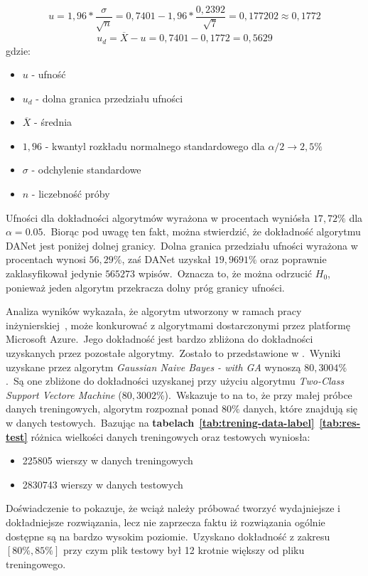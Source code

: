 \begin{itemize}
    \begin{equation}
        \label{eq:uf}
        u = 1,96 * \frac{\sigma}{\sqrt{n}}= 0,7401-1,96*\frac{0,2392}{\sqrt{7}} = 0,177202 \approx 0,1772
    \end{equation}
    \begin{equation}
        \label{eq:uf-d}
        u_d = \overline{X} - u = 0,7401 - 0,1772 = 0,5629
    \end{equation}
    gdzie:
    \begin{itemize}
        \item $u$ - ufność
        \item $u_d$ - dolna granica przedziału ufności
        \item $\overline{X}$ - średnia
        \item $1,96$ - kwantyl rozkładu normalnego standardowego dla $\alpha/2 \rightarrow 2,5\%$
        \item $\sigma$ - odchylenie standardowe
        \item $n$ - liczebność próby
    \end{itemize}

    Ufności dla dokładności algorytmów wyrażona w procentach wyniósła $17,72\%$ dla $\alpha = 0.05$.\ Biorąc pod uwagę ten fakt, można stwierdzić, że dokładność algorytmu DANet jest poniżej dolnej granicy.\ Dolna granica przedziału ufności wyrażona w procentach wynosi $56,29\%$, zaś DANet uzyskał $19,9691\%$ oraz poprawnie zaklasyfikował jedynie $565273$ wpisów.\ Oznacza to, że można odrzucić $H_0$, ponieważ jeden algorytm przekracza dolny próg granicy ufności. \\
\end{itemize}
Analiza wyników wykazała, że algorytm utworzony w ramach pracy inżynierskiej~\cite{Blyszcz2022}, może konkurować z algorytmami dostarczonymi przez platformę Microsoft Azure.\ Jego dokładność jest bardzo zbliżona do dokładności uzyskanych przez pozostałe algorytmy.\ Zostało to przedstawione w .\ Wyniki uzyskane przez algorytm \textit{Gaussian Naive Bayes - with GA} wynoszą $80,3004\%$.\ Są one zbliżone do dokładności uzyskanej przy użyciu algorytmu \textit{Two-Class Support Vectore Machine} ($80,3002\%$).\ Wskazuje to na to, że przy małej próbce danych treningowych, algorytm rozpoznał ponad $80\%$ danych, które znajdują się w danych testowych.\ Bazując na \textbf{tabelach}~\textbf{\ref{tab:trening-data-label}}~\textbf{\ref{tab:res-test}} różnica wielkości danych treningowych oraz testowych wyniosła:
\begin{itemize}
    \item 225805 wierszy w danych treningowych
    \item 2830743 wierszy w danych testowych
\end{itemize}

Doświadczenie to pokazuje, że wciąż należy próbować tworzyć wydajniejsze i dokładniejsze rozwiązania, lecz nie zaprzecza faktu iż rozwiązania ogólnie dostępne są na bardzo wysokim poziomie.\ Uzyskano dokładność z zakresu $[80\%, 85\%]$ przy czym plik testowy był 12 krotnie większy od pliku treningowego.